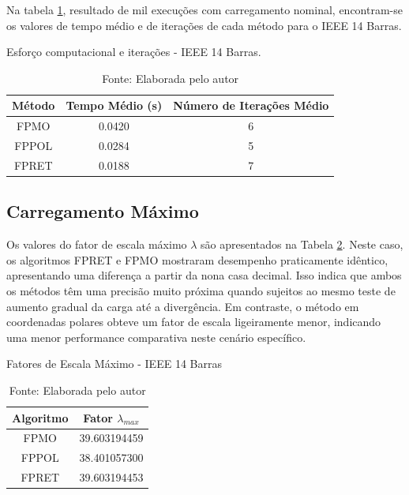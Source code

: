 Na tabela \ref{tabela_tempo_14}, resultado de mil execuções com carregamento nominal, encontram-se os valores de tempo médio e de iterações de cada método para o IEEE 14 Barras. 

\begin{table}[H]
    \centering
    \caption{Esforço computacional e iterações - IEEE 14 Barras.}
    \begin{tabular}{c c c }
        \toprule
        Método & Tempo Médio (s)& Número de Iterações Médio \\
        \midrule
        FPMO & 0.0420 & 6 \\
        FPPOL & 0.0284 & 5 \\
        FPRET & 0.0188 & 7 \\
        \bottomrule
    \end{tabular}
    \caption*{Fonte: Elaborada pelo autor}
    \label{tabela_tempo_14}
\end{table}

\subsection{Carregamento Máximo}
Os valores do fator de escala máximo $\lambda$ são apresentados na Tabela \ref{tabela_fatores_escala_14}. Neste caso, os algoritmos FPRET e FPMO mostraram desempenho praticamente idêntico, apresentando uma diferença a partir da nona casa decimal. Isso indica que ambos os métodos têm uma precisão muito próxima quando sujeitos ao mesmo teste de aumento gradual da carga até a divergência. Em contraste, o método em coordenadas polares obteve um fator de escala ligeiramente menor, indicando uma menor performance comparativa neste cenário específico.


\begin{table}[H]
\centering
\caption{Fatores de Escala Máximo - IEEE 14 Barras}
\begin{tabular}{c c}
\hline
\textbf{Algoritmo} & \textbf{Fator $\lambda_{max}$} \\
\hline
FPMO  & 39.603194459 \\
FPPOL & 38.401057300 \\
FPRET & 39.603194453 \\
\hline
\end{tabular}
\label{tabela_fatores_escala_14}
\caption*{Fonte: Elaborada pelo autor}
\end{table}



